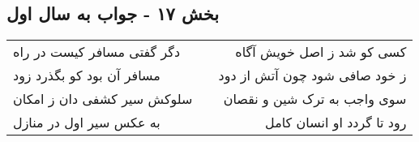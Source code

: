 \begin{center}
\section*{بخش ۱۷ - جواب به سال اول}
\label{sec:sh017}
\begin{longtable}{l p{0.5cm} r}
دگر گفتی مسافر کیست در راه
&&
کسی کو شد ز اصل خویش آگاه
\\
مسافر آن بود کو بگذرد زود
&&
ز خود صافی شود چون آتش از دود
\\
سلوکش سیر کشفی دان ز امکان
&&
سوی واجب به ترک شین و نقصان
\\
به عکس سیر اول در منازل
&&
رود تا گردد او انسان کامل
\\
\end{longtable}
\end{center}
